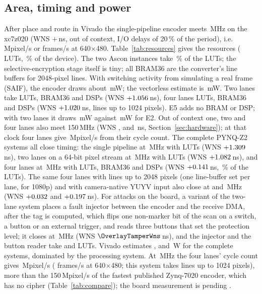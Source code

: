 \subsection{Area, timing and power}

After place and route in Vivado the single-pipeline encoder meets \TopMhz\,MHz on the xc7z020 (WNS $+$\TopWns\,ns, out of context, I/O delays of 20\,\% of the period), i.e.\ \TopMpix\,Mpixel/s or \FpsVGA{} frames/s at 640$\times$480. Table~\ref{tab:resources} gives the resources (\TopLuts{} LUTs, \TopLutPct\,\% of the device). The two Ascon instances take \CryptoLutShare\,\% of the LUTs; the selective-encryption stage itself is tiny; all \ConvBram{} BRAM36 are the converter's line buffers for 2048-pixel lines. With switching activity from simulating a real frame (SAIF), the encoder draws about \SaifTopMw\,mW; the vectorless estimate is \TopPowerMw\,mW. Two lanes take \TwoLanesLuts{} LUTs, \TwoLanesBram{} BRAM36 and \TwoLanesDsp{} DSPs (WNS $+1.056$\,ns), four lanes \FourLanesLuts{} LUTs, \FourLanesBram{} BRAM36 and \FourLanesDsp{} DSPs (WNS $+1.020$\,ns, lines up to 1024 pixels). E5 adds no BRAM or DSP; with two lanes it draws \SaifLanesEfiveMw\,mW against \SaifLanesEtwoMw\,mW for E2. Out of context one, two and four lanes also meet 150\,MHz (WNS \TopWnsAtOneFifty, \LanesTwoWnsAtOneFifty{} and \LanesFourWnsAtOneFifty\,ns, Section~\ref{sec:hardware}); at that clock four lanes give \LanesFourFastMpix\,Mpixel/s from their cycle count. The complete PYNQ-Z2 systems all close timing: the single pipeline at \OverlayMhz\,MHz with \OverlayLuts{} LUTs (WNS $+1.309$\,ns), two lanes on a 64-bit pixel stream at \OverlayLanesMhz\,MHz with \OverlayLanesLuts{} LUTs (WNS $+1.082$\,ns), and four lanes at \OverlayLanesFourMhz\,MHz with \OverlayLanesFourLuts{} LUTs, \OverlayLanesFourBram{} BRAM36 and \OverlayLanesFourDsp{} DSPs (WNS $+0.141$\,ns, \OverlayLanesFourLutPct\,\% of the LUTs). The same four lanes with lines up to 2048 pixels (one line-buffer set per lane, for 1080p) and with camera-native YUYV input also close at \OverlayLanesFourHdMhz{} and \OverlayLanesFourYuyvMhz\,MHz (WNS $+0.032$ and $+0.197$\,ns). For attacks on the board, a variant of the two-lane system places a fault injector between the encoder and the receive DMA, after the tag is computed, which flips one non-marker bit of the scan on a switch, a button or an external trigger, and reads three buttons that set the protection level; it closes at \OverlayTamperMhz\,MHz (WNS $\OverlayTamperWns$\,ns), and the injector and the button reader take \TamperInjLuts{} and \TamperBtnLuts{} LUTs. Vivado estimates \OverlayPowerW, \OverlayLanesPowerW{} and \OverlayLanesFourPowerW\,W for the complete systems, dominated by the processing system. At \OverlayLanesFourMhz\,MHz the four lanes' cycle count gives \SysFourLanesMpix\,Mpixel/s (\SysFourLanesFps{} frames/s at 640$\times$480; this system takes lines up to 1024 pixels), more than the 150\,Mpixel/s of the fastest published Zynq-7020 encoder, which has no cipher (Table~\ref{tab:compare}); the board measurement is pending .

